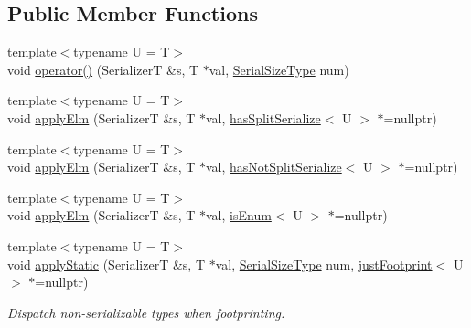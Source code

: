 \subsection*{Public Member Functions}
\begin{DoxyCompactItemize}
\item 
{\footnotesize template$<$typename U  = T$>$ }\\void \hyperlink{structcheckpoint_1_1dispatch_1_1_serializer_dispatch_non_byte_a6cf01feb8acb29ef56c37d3180b63671}{operator()} (SerializerT \&s, T $\ast$val, \hyperlink{namespacecheckpoint_a083f6674da3f94c2901b18c6d238217c}{Serial\+Size\+Type} num)
\item 
{\footnotesize template$<$typename U  = T$>$ }\\void \hyperlink{structcheckpoint_1_1dispatch_1_1_serializer_dispatch_non_byte_a3bbb12db16d00e1c76e51b52452187aa}{apply\+Elm} (SerializerT \&s, T $\ast$val, \hyperlink{structcheckpoint_1_1dispatch_1_1_serializer_dispatch_non_byte_a36fe4f2245004d2daa486a9e47b98b71}{has\+Split\+Serialize}$<$ U $>$ $\ast$=nullptr)
\item 
{\footnotesize template$<$typename U  = T$>$ }\\void \hyperlink{structcheckpoint_1_1dispatch_1_1_serializer_dispatch_non_byte_a88fe1c00864f170cd59deb25a2bf2695}{apply\+Elm} (SerializerT \&s, T $\ast$val, \hyperlink{structcheckpoint_1_1dispatch_1_1_serializer_dispatch_non_byte_a596c2f6081cc55d5ff0b7486f50b227b}{has\+Not\+Split\+Serialize}$<$ U $>$ $\ast$=nullptr)
\item 
{\footnotesize template$<$typename U  = T$>$ }\\void \hyperlink{structcheckpoint_1_1dispatch_1_1_serializer_dispatch_non_byte_a7cd7decd9c65f3f5d68a2e593275f8d1}{apply\+Elm} (SerializerT \&s, T $\ast$val, \hyperlink{structcheckpoint_1_1dispatch_1_1_serializer_dispatch_non_byte_ac47ded9971a3ed3d8d1824d1ff12031a}{is\+Enum}$<$ U $>$ $\ast$=nullptr)
\item 
{\footnotesize template$<$typename U  = T$>$ }\\void \hyperlink{structcheckpoint_1_1dispatch_1_1_serializer_dispatch_non_byte_a38d952156a857c4eba994db912725590}{apply\+Static} (SerializerT \&s, T $\ast$val, \hyperlink{namespacecheckpoint_a083f6674da3f94c2901b18c6d238217c}{Serial\+Size\+Type} num, \hyperlink{structcheckpoint_1_1dispatch_1_1_serializer_dispatch_non_byte_a162005f14e0a0cf2f3df64c2d9ec4d9e}{just\+Footprint}$<$ U $>$ $\ast$=nullptr)
\begin{DoxyCompactList}\small\item\em Dispatch non-\/serializable types when footprinting. \end{DoxyCompactList}\item 

\end{DoxyCompactItemize}
